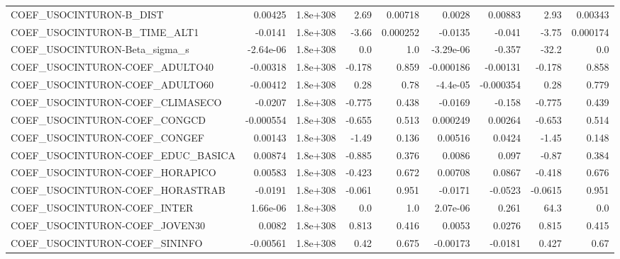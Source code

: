 \begin{tabular}{lrrrrrrrr}
COEF\_USOCINTURON-B\_DIST           &     0.00425 &     1.8e+308 &    2.69 &  0.00718 &     0.0028 &     0.00883 &         2.93 &       0.00343 \\
COEF\_USOCINTURON-B\_TIME\_ALT1      &     -0.0141 &     1.8e+308 &   -3.66 & 0.000252 &    -0.0135 &      -0.041 &        -3.75 &      0.000174 \\
COEF\_USOCINTURON-Beta\_sigma\_s     &   -2.64e-06 &     1.8e+308 &     0.0 &      1.0 &  -3.29e-06 &      -0.357 &        -32.2 &           0.0 \\
COEF\_USOCINTURON-COEF\_ADULTO40    &    -0.00318 &     1.8e+308 &  -0.178 &    0.859 &  -0.000186 &    -0.00131 &       -0.178 &         0.858 \\
COEF\_USOCINTURON-COEF\_ADULTO60    &    -0.00412 &     1.8e+308 &    0.28 &     0.78 &   -4.4e-05 &   -0.000354 &         0.28 &         0.779 \\
COEF\_USOCINTURON-COEF\_CLIMASECO   &     -0.0207 &     1.8e+308 &  -0.775 &    0.438 &    -0.0169 &      -0.158 &       -0.775 &         0.439 \\
COEF\_USOCINTURON-COEF\_CONGCD      &   -0.000554 &     1.8e+308 &  -0.655 &    0.513 &   0.000249 &     0.00264 &       -0.653 &         0.514 \\
COEF\_USOCINTURON-COEF\_CONGEF      &     0.00143 &     1.8e+308 &   -1.49 &    0.136 &    0.00516 &      0.0424 &        -1.45 &         0.148 \\
COEF\_USOCINTURON-COEF\_EDUC\_BASICA &     0.00874 &     1.8e+308 &  -0.885 &    0.376 &     0.0086 &       0.097 &        -0.87 &         0.384 \\
COEF\_USOCINTURON-COEF\_HORAPICO    &     0.00583 &     1.8e+308 &  -0.423 &    0.672 &    0.00708 &      0.0867 &       -0.418 &         0.676 \\
COEF\_USOCINTURON-COEF\_HORASTRAB   &     -0.0191 &     1.8e+308 &  -0.061 &    0.951 &    -0.0171 &     -0.0523 &      -0.0615 &         0.951 \\
COEF\_USOCINTURON-COEF\_INTER       &    1.66e-06 &     1.8e+308 &     0.0 &      1.0 &   2.07e-06 &       0.261 &         64.3 &           0.0 \\
COEF\_USOCINTURON-COEF\_JOVEN30     &      0.0082 &     1.8e+308 &   0.813 &    0.416 &     0.0053 &      0.0276 &        0.815 &         0.415 \\
COEF\_USOCINTURON-COEF\_SININFO     &    -0.00561 &     1.8e+308 &    0.42 &    0.675 &   -0.00173 &     -0.0181 &        0.427 &          0.67 \\

\end{tabular}
